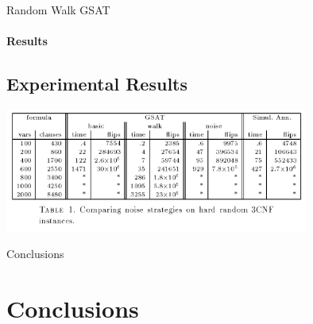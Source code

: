 \documentclass{beamer}
\begin{document}
\begin{frame}{Random Walk GSAT}
\framesubtitle{Results}
\subsection{Experimental Results}

\includegraphics[width=10cm]{imgs/tab1.png}

\end{frame}
\begin{frame}{Conclusions}
\section{Conclusions}

\end{frame}
\end{document}
